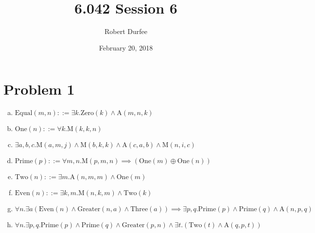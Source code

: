 \documentclass{article}
\title{ 6.042 Session 6 }
\author{ Robert Durfee }
\date{ February 20, 2018 }
\begin{document}
\maketitle

\section*{Problem 1 }

\begin{enumerate}[a.]
  \item $ \mathrm{Equal}(m, n) ::= \exists k . \mathrm{Zero}(k) \land
    \mathrm{A}(m, n, k) $
  \item $ \mathrm{One}(n) ::= \forall k . \mathrm{M}(k, k, n) $
  \item $ \exists a , b , c . \mathrm{M}(a, m, j) \land
    \mathrm{M}(b, k, k) \land \mathrm{A}(c, a, b) \land \mathrm{M}(n, i, c) $
  \item $ \mathrm{Prime}(p) ::= \forall m , n . \mathrm{M}(p, m, n)
    \implies (\mathrm{One}(m) \oplus \mathrm{One}(n)) $
  \item $ \mathrm{Two}(n) ::= \exists m . \mathrm{A}(n, m, m) \land
    \mathrm{One}(m) $
  \item $ \mathrm{Even}(n) ::= \exists k, m . \mathrm{M}(n, k, m) \land
    \mathrm{Two}(k) $
  \item $ \forall n . \exists a (\mathrm{Even}(n) \land \mathrm{Greater}(n, a)
    \land \mathrm{Three}(a)) \implies \exists p, q . \mathrm{Prime}(p) \land
    \mathrm{Prime}(q) \land \mathrm{A}(n, p, q) $
  \item $ \forall n . \exists p, q . \mathrm{Prime}(p) \land \mathrm{Prime}(q)
    \land \mathrm{Greater}(p, n) \land \exists t . (\mathrm{Two}(t) \land
    \mathrm{A}(q, p, t)) $
\end{enumerate}
\end{document}
